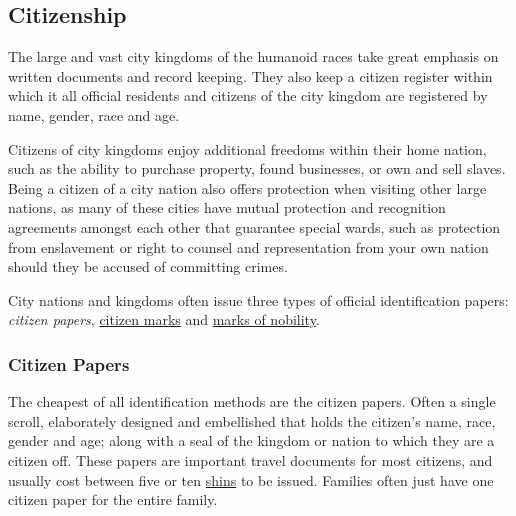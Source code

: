 \subsection{Citizenship}
\label{sec:Citizenship}

The large and vast city kingdoms of the humanoid races take great emphasis
on written documents and record keeping. They also keep a citizen register
within which it all official residents and citizens of the city kingdom are
registered by name, gender, race and age.

Citizens of city kingdoms enjoy additional freedoms within their home nation,
such as the ability to purchase property, found businesses, or own and sell
slaves. Being a citizen of a city nation also offers protection when visiting
other large nations, as many of these cities have mutual protection and
recognition agreements amongst each other that guarantee special wards, such
as protection from enslavement or right to counsel and representation from your
own nation should they be accused of committing crimes.

City nations and kingdoms often issue three types of official identification
papers: \emph{citizen papers}, \hyperref[sec:Citizen Mark]{citizen marks} and
\hyperref[sec:Nobility Mark]{marks of nobility}.

\subsubsection{Citizen Papers}
\label{sec:Citizen Papers}

The cheapest of all identification methods are the citizen papers. Often a
single scroll, elaborately designed and embellished that holds the citizen's
name, race, gender and age; along with a seal of the kingdom or nation to
which they are a citizen off. These papers are important travel documents for
most citizens, and usually cost between five or ten \hyperref[sec:Shin]{shins}
to be issued. Families often just have one citizen paper for the entire family.
